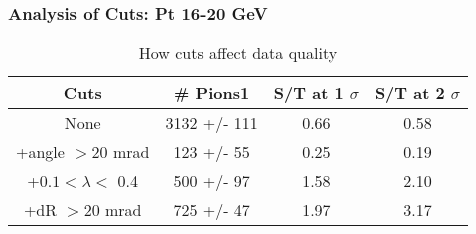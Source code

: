 \frame
{
\frametitle{Analysis of Cuts: Pt 16-20 GeV}
\begin{table}
\caption{How cuts affect data quality}
\centering
\begin{tabular}{c c c c}
\hline\hline
Cuts & \# Pions1 & S/T at 1 $\sigma$ & S/T at 2 $\sigma$ \\ [0.5ex]
\hline
None & 3132 +/-  111 & 0.66 & 0.58 \\ %
+angle $> 20$ mrad &  123 +/-   55 & 0.25 & 0.19 \\ %
+$0.1 < \lambda <$ 0.4 &  500 +/-   97 & 1.58 & 2.10 \\ %
+dR $> 20$ mrad &  725 +/-   47 & 1.97 & 3.17 \\ %
[1ex]
\hline
\end{tabular}
\label{table:nonlin}
\end{table}
}
